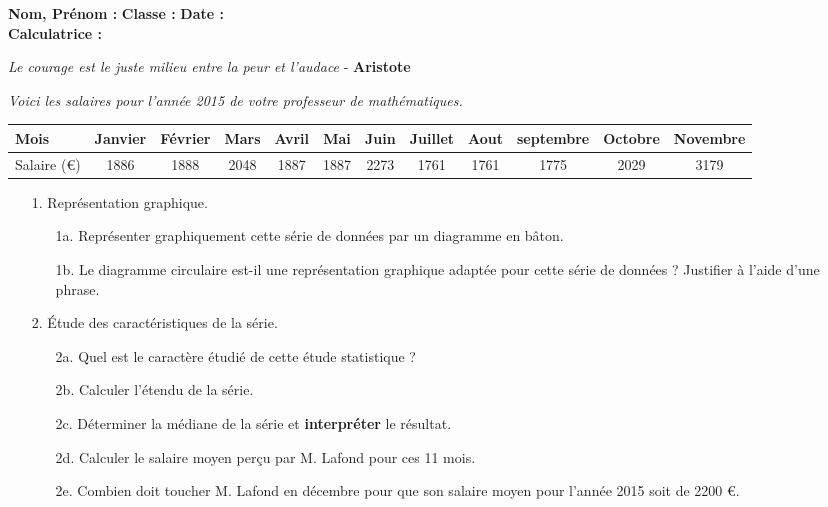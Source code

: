 \documentclass[12pt]{article}
\begin{document}

\textbf{Nom, Prénom :} \hspace{8cm} \textbf{Classe :} \hspace{3cm} \textbf{Date :}\\
\textbf{Calculatrice :}

\begin{center}
  \textit{Le courage est le juste milieu entre la peur et l'audace} - \textbf{Aristote}
\end{center}

\textit{Voici les salaires pour l'année 2015 de votre professeur de mathématiques.}

\begin{center}
  \begin{tabular}{| l || c | c | c  | c  | c  | c  | c  | c  | c  | c  | c |}
    \hline
    Mois & Janvier & Février & Mars & Avril &  Mai & Juin & Juillet & Aout & septembre & Octobre & Novembre \\
    \hline 
    Salaire (\euro) &   1886  &    1888 & 2048 &  1887 & 1887 & 2273    & 1761 & 1761 &      1775 &    2029 &     3179 \\
    \hline
  \end{tabular}
\end{center}

\begin{enumerate}
\item[1.] Représentation graphique.
  \begin{enumerate}
  \item[1a.] Représenter graphiquement cette série de données par un diagramme en bâton.
  \item[1b.] Le diagramme circulaire est-il une représentation graphique adaptée pour cette série de données ? Justifier à l'aide d'une phrase.
  \end{enumerate}

\item[2.] Étude des caractéristiques de la série.

  \begin{enumerate}
  \item[2a.] Quel est le caractère étudié de cette étude statistique ?
  \item[2b.] Calculer l'étendu de la série.
  \item[2c.] Déterminer la médiane de la série et \textbf{interpréter} le résultat.
  \item[2d.] Calculer le salaire moyen perçu par M. Lafond pour ces 11 mois.
  \item[2e.] Combien doit toucher M. Lafond en décembre pour que son salaire moyen pour l'année 2015 soit de 2200 \euro.		
  \end{enumerate}

\end{enumerate}
\end{document}
